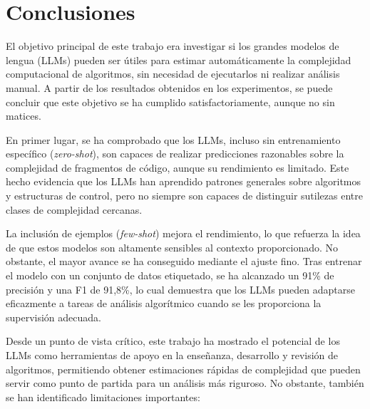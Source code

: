 \documentclass[12pt,twoside]{article}
\begin{document}
\section{Conclusiones}

El objetivo principal de este trabajo era investigar si los grandes modelos de lengua (LLMs) pueden ser útiles para estimar automáticamente la complejidad computacional de algoritmos, sin necesidad de ejecutarlos ni realizar análisis manual. A partir de los resultados obtenidos en los experimentos, se puede concluir que este objetivo se ha cumplido satisfactoriamente, aunque no sin matices.

En primer lugar, se ha comprobado que los LLMs, incluso sin entrenamiento específico (\textit{zero-shot}), son capaces de realizar predicciones razonables sobre la complejidad de fragmentos de código, aunque su rendimiento es limitado. Este hecho evidencia que los LLMs han aprendido patrones generales sobre algoritmos y estructuras de control, pero no siempre son capaces de distinguir sutilezas entre clases de complejidad cercanas.

La inclusión de ejemplos (\textit{few-shot}) mejora el rendimiento, lo que refuerza la idea de que estos modelos son altamente sensibles al contexto proporcionado. No obstante, el mayor avance se ha conseguido mediante el ajuste fino. Tras entrenar el modelo con un conjunto de datos etiquetado, se ha alcanzado un 91\% de precisión y una F1 de 91,8\%, lo cual demuestra que los LLMs pueden adaptarse eficazmente a tareas de análisis algorítmico cuando se les proporciona la supervisión adecuada.

Desde un punto de vista crítico, este trabajo ha mostrado el potencial de los LLMs como herramientas de apoyo en la enseñanza, desarrollo y revisión de algoritmos, permitiendo obtener estimaciones rápidas de complejidad que pueden servir como punto de partida para un análisis más riguroso. No obstante, también se han identificado limitaciones importantes:
\end{document}
